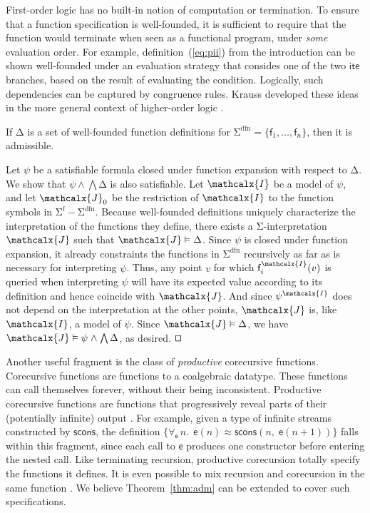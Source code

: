 \documentclass[runningheads,a4paper]{llncs}
\renewcommand\models{\mathrel{\vDash}}
\newcommand\DDD{\Delta}
\newcommand{\con}[1]{\mathsf{#1}}
\let\const=\con
\renewcommand\vec[1]{\overline{#1}}
\let\oldSigma=\Sigma
\def\Sigma{\mathrm{\oldSigma}}
\let\oldDelta=\Delta
\def\Delta{\mathrm{\oldDelta}}
\let\oldwedge=\wedge
\def\wedge{\mathrel{\oldwedge}}
\newcommand{\teq}{\approx}
\newcommand{\terms}{\mathcalx{T}}
\newcommand{\I}{\mathcalx{I}}
\newcommand{\J}{\mathcalx{J}}
\newcommand{\sfuns}[1]{#1^\mathrm{f}}
\newcommand{\sfundefs}[1]{#1^\mathrm{dfn}}
\newcommand{\lite}{\con{ite}}
\newcommand{\forallf}[1]{\forall_{\!#1\:}}
\renewcommand\qed{{\hfill$\squareforqed$}}
\begin{document}
First-order logic has no built-in notion of computation or termination. To ensure
that a function specification is well-founded, it is sufficient to require that
the function would terminate when seen as a functional program, under \emph{some}
evaluation order. For example, definition~(\ref{eq:pii}) from the
introduction can be shown well-founded under an evaluation strategy that
consides one of the two $\lite$ branches, based on the result of evaluating the
condition. Logically, such dependencies can be captured by congruence rules.
Krauss developed these ideas in the more general context of
higher-order logic \cite[Section 2]{krauss-2009-phd}.

\begin{theorem}\label{thm:adm}
If\/
$\DDD$ is a set of well-founded function definitions for\/
$\sfundefs{\Sigma} = \{\con{f}_1,\ldots,\con{f}_n\}$, then it is admissible.
\end{theorem}
\begin{proofsketch}
Let $\psi$ be a satisfiable formula closed under function expansion with
respect to $\DDD$. We show that $\psi \wedge \bigwedge \Delta$ is also
satisfiable. Let $\I$ be a model of $\psi$, and
let $\J_0$ be the restriction of $\I$ to the function symbols in $\sfuns{\Sigma} -
\sfundefs{\Sigma}$. Because well-founded definitions uniquely characterize
the interpretation of the functions they define, there exists a
$\Sigma$-interpretation $\J$ such that $\J \models \Delta$.
%
Since $\psi$ is closed under function expansion, it already constraints the
functions in $\sfundefs{\Sigma}$ recursively as far as is
necessary for interpreting $\psi$. Thus, any point $v$ for which
$\const{f}_i^\I(v)$ is queried when interpreting $\psi$ will have its
expected value according to its definition and hence coincide with $\J$.
And since $\psi^\I$ does not depend on the interpretation at the other
points, $\J$ is, like $\I$, a model of $\psi$.
Since $\J \models \Delta$, we have $\J \models \psi \wedge \bigwedge \Delta$,
as desired.
\qed
\end{proofsketch}

Another useful fragment is the class of \emph{productive} corecursive
functions. Corecursive functions are functions to a coalgebraic datatype.
These functions can call themselves forever, without their being inconsistent.
Productive corecursive functions are functions that progressively reveal parts
of their (potentially infinite)
output \cite{turner-1995,mcbride-productive}.
For example, given a type of infinite streams constructed by $\con{scons}$,
the definition
$\{\forallf{\const{e}} n.\;\, \const{e}(n) \teq \con{scons}(n,\; \const{e}(n + 1))\}$
falls within this fragment, since each call to $\const{e}$ produces one
constructor before entering the nested call. Like terminating recursion,
productive corecursion totally specify the functions it defines.
It is even possible to mix recursion and corecursion in the same function
\cite{blanchette-et-al-2015-fouco}. We believe Theorem~\ref{thm:adm} can
be extended to cover such specifications.
\end{document}
